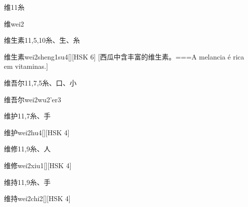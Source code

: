 \begin{Entry}{维}{11}{⽷}
  \begin{Phonetics}{维}{wei2}
  \end{Phonetics}
\end{Entry}

\begin{Entry}{维生素}{11,5,10}{⽷、⽣、⽷}
  \begin{Phonetics}{维生素}{wei2sheng1su4}[][HSK 6]
    [西瓜中含丰富的维生素。===A melancia é rica em vitaminas.]
  \end{Phonetics}
\end{Entry}

\begin{Entry}{维吾尔}{11,7,5}{⽷、⼝、⼩}
  \begin{Phonetics}{维吾尔}{wei2wu2'er3}
  \end{Phonetics}
\end{Entry}

\begin{Entry}{维护}{11,7}{⽷、⼿}
  \begin{Phonetics}{维护}{wei2hu4}[][HSK 4]
  \end{Phonetics}
\end{Entry}

\begin{Entry}{维修}{11,9}{⽷、⼈}
  \begin{Phonetics}{维修}{wei2xiu1}[][HSK 4]
  \end{Phonetics}
\end{Entry}

\begin{Entry}{维持}{11,9}{⽷、⼿}
  \begin{Phonetics}{维持}{wei2chi2}[][HSK 4]
  \end{Phonetics}
\end{Entry}

